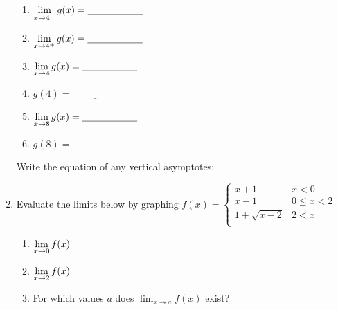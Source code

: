 \documentclass[11pt,fleqn]{article}
\begin{document}
\begin{enumerate}
\begin{multicols}{2}
\columnbreak
\begin{enumerate}
\item $\displaystyle{\lim_{x \to 4^-} g(x) = \underline{\hspace{2cm}} }$
\item $\displaystyle{\lim_{x \to 4^+} g(x) = \underline{\hspace{2cm}} }$
\item $\displaystyle{\lim_{x \to 4} g(x) = \underline{\hspace{2cm}} }$
\item $g(4)= \underline{\hspace{2cm}}$
\item $\displaystyle{\lim_{x \to 8} g(x) = \underline{\hspace{2cm}} }$
\item $g(8)= \underline{\hspace{2cm}}$
\end{enumerate}
\end{multicols}

Write the equation of any vertical asymptotes:\\
\newpage

\item Evaluate the limits below by graphing $f(x)=\begin{cases} x+1 & x < 0 \\ 
x -1 & 0 \leq x < 2 \\
1+\sqrt{x-2}& 2<x \\
\end{cases}$
\vspace{2in}
\begin{enumerate}
\item $\displaystyle{\lim_{x \to 0} f(x)}$
\vspace{.7in}
\item $\displaystyle{\lim_{x \to 2} f(x)}$
\vspace{.7in}
\item For which values $a$ does $\lim_{x \to a} f(x)$ exist?
\end{enumerate}
\end{enumerate}
\end{document}
